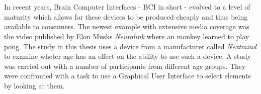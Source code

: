 



\usepackage[utf8]{inputenc} %





\newcommand{\vorname}{Julius}
\newcommand{\nachname}{Neudecker}
\newcommand{\matrikelnummer}{2025850}

\newcommand{\titel}{{The influence of age on the ability to use Brain-Computer-Interfaces}\\[0.2ex] 
				\Large Use-case: TV remote control}

\newcommand{\erstpruef}{Prof. Dr.Roland Greule}
\newcommand{\zweitpruef}{Dipl. Inf. Rüdiger Höfert}

\date{preliminary version from \today}   %



    \maketitle
    \tableofcontents
    \clearpage          %


    \thispagestyle{empty}
    \section*{\centering\abstractname}
    In recent years, Brain Computer Interfaces - BCI in short - evolved to a level of maturity which allows for these devices to be produced cheaply and thus being available to consumers. The newest example with extensive media coverage was the video published by Elon Musks \textit{Neuralink} where an monkey learned to play pong. The study in this thesis uses a device from a manufacturer called \textit{Nextmind} to examine wheter age has an effect on the ability to use such a device. A study was carried out with a number of  participants from different age groups. They were confronted with a task to use a Graphical User Interface to select elements by looking at them. 

